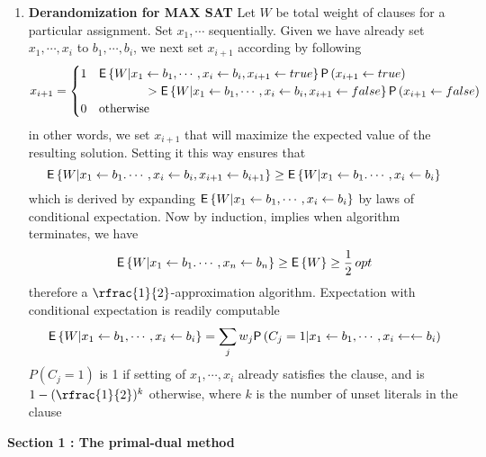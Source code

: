 \documentclass[11pt]{article}
\begin{document}
\begin{enumerate}
    \item \textbf{Derandomization for MAX SAT} Let $W$ be total weight of clauses for a particular assignment. Set $x_1, \cdots$ sequentially. Given we have already set $x_1,\cdots, x_i$ to $b_1, \cdots, b_i$, we next set $x_{i+1}$ according by following
    \[
        x_{i+1} = 
        \begin{cases}
            1 & \mathsf{E}\left\{W | x_1 \leftarrow b_1, \cdots, x_i \leftarrow b_i, x_{i+1}\leftarrow true\right\} \mathsf{P}\left(x_{i+1}\leftarrow true\right) 
            \\
            &\qquad \qquad > \mathsf{E}\left\{W | x_1 \leftarrow b_1, \cdots, x_i \leftarrow b_i, x_{i+1}\leftarrow false\right\} \mathsf{P}\left(x_{i+1}\leftarrow false\right) \\
            0 & \text{otherwise}
        \end{cases}    
    \]
    in other words, we set $x_{i+1}$ that will maximize the expected value of the resulting solution. Setting it this way ensures that
    \[
        \mathsf{E}\left\{W|x_1\leftarrow b_1. \cdots, x_{i}\leftarrow b_i, x_{i+1}\leftarrow b_{i+1}\right\} 
        \geq \mathsf{E}\left\{W|x_1\leftarrow b_1. \cdots, x_{i}\leftarrow b_i\right\}
    \]
    which is derived by expanding $\mathsf{E}\left\{W|x_1\leftarrow b_1, \cdots, x_i\leftarrow b_i\right\}$ by laws of conditional expectation. Now by induction, implies when algorithm terminates, we have 
    \[
        \mathsf{E}\left\{W|x_1\leftarrow b_1. \cdots, x_{n}\leftarrow b_n\right\}
        \geq \mathsf{E}\left\{W\right\} \geq \frac{1}{2} \, opt
    \]
    therefore a $\rfrac{1}{2}$-approximation algorithm. Expectation with conditional expectation is readily computable  
    \[
        \mathsf{E}\left\{W|x_1 \leftarrow b_1, \cdots, x_i \leftarrow  b_i\right\} = 
        \sum_j w_j \mathsf{P}\left(C_j=1|x_1 \leftarrow b_1, \cdots, x_i \leftarrow \leftarrow b_i\right)
    \]
    $P(C_j=1)$ is 1 if setting of $x_1,\cdots,x_i$ already satisfies the clause, and is $1-(\rfrac{1}{2})^k$ otherwise, where $k$ is the number of unset literals in the clause
\end{enumerate}


$ $\\
\textbf{Section 1 : The primal-dual method}
\end{document}
